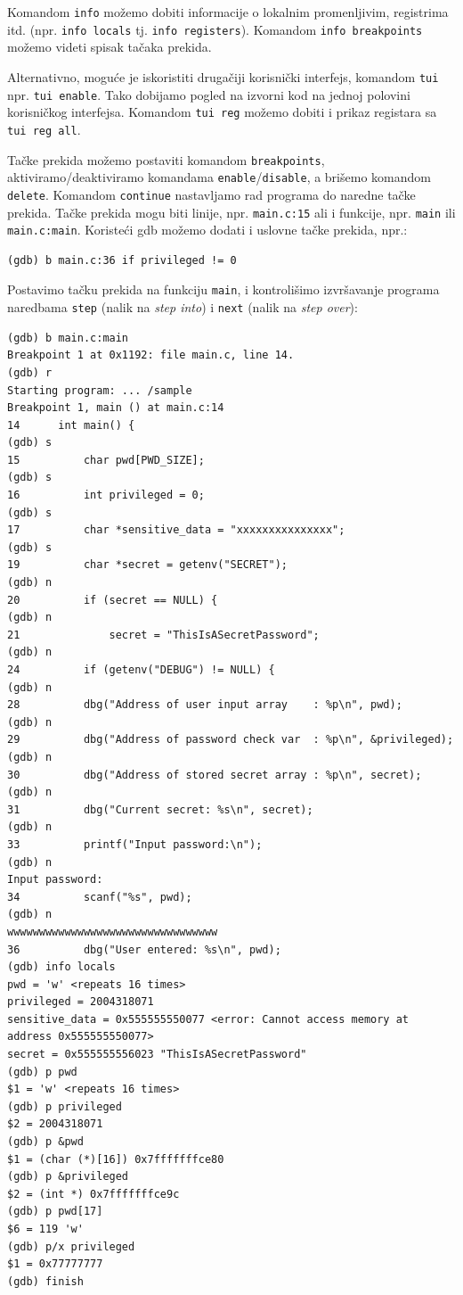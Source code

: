 Komandom \texttt{info} možemo dobiti informacije o lokalnim promenljivim, registrima itd. (npr. \texttt{info\ locals} tj. \texttt{info\ registers}). Komandom \texttt{info\ breakpoints} možemo videti spisak tačaka prekida.

Alternativno, moguće je iskoristiti drugačiji korisnički interfejs, komandom \texttt{tui} npr. \texttt{tui\ enable}. Tako dobijamo pogled na izvorni kod na jednoj polovini korisničkog interfejsa. Komandom \texttt{tui\ reg} možemo dobiti i prikaz registara sa \texttt{tui\ reg\ all}.

Tačke prekida možemo postaviti komandom \texttt{breakpoints}, aktiviramo/deaktiviramo komandama \texttt{enable}/\texttt{disable}, a brišemo komandom \texttt{delete}. Komandom \texttt{continue} nastavljamo rad programa do naredne tačke prekida. Tačke prekida mogu biti linije, npr. \texttt{main.c:15} ali i funkcije, npr. \texttt{main} ili \texttt{main.c:main}. Koristeći gdb možemo dodati i uslovne tačke prekida, npr.:

\begin{verbatim}
(gdb) b main.c:36 if privileged != 0
\end{verbatim}

Postavimo tačku prekida na funkciju \texttt{main}, i kontrolišimo izvršavanje programa naredbama \texttt{step} (nalik na \emph{step into}) i \texttt{next} (nalik na \emph{step over}):

\begin{verbatim}
(gdb) b main.c:main
Breakpoint 1 at 0x1192: file main.c, line 14.
(gdb) r
Starting program: ... /sample
Breakpoint 1, main () at main.c:14
14      int main() {
(gdb) s
15          char pwd[PWD_SIZE];
(gdb) s
16          int privileged = 0;
(gdb) s
17          char *sensitive_data = "xxxxxxxxxxxxxxx";
(gdb) s
19          char *secret = getenv("SECRET");
(gdb) n
20          if (secret == NULL) {
(gdb) n
21              secret = "ThisIsASecretPassword";
(gdb) n
24          if (getenv("DEBUG") != NULL) {
(gdb) n
28          dbg("Address of user input array    : %p\n", pwd);
(gdb) n
29          dbg("Address of password check var  : %p\n", &privileged);
(gdb) n
30          dbg("Address of stored secret array : %p\n", secret);
(gdb) n
31          dbg("Current secret: %s\n", secret);
(gdb) n
33          printf("Input password:\n");
(gdb) n
Input password:
34          scanf("%s", pwd);
(gdb) n
wwwwwwwwwwwwwwwwwwwwwwwwwwwwwwwww
36          dbg("User entered: %s\n", pwd);
(gdb) info locals
pwd = 'w' <repeats 16 times>
privileged = 2004318071
sensitive_data = 0x555555550077 <error: Cannot access memory at address 0x555555550077>
secret = 0x555555556023 "ThisIsASecretPassword"
(gdb) p pwd
$1 = 'w' <repeats 16 times>
(gdb) p privileged
$2 = 2004318071
(gdb) p &pwd
$1 = (char (*)[16]) 0x7fffffffce80
(gdb) p &privileged
$2 = (int *) 0x7fffffffce9c
(gdb) p pwd[17]
$6 = 119 'w'
(gdb) p/x privileged
$1 = 0x77777777
(gdb) finish
\end{verbatim}

